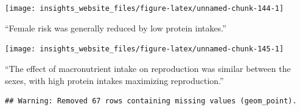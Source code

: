 \documentclass[]{book}
\newenvironment{Shaded}{\begin{snugshade}}{\end{snugshade}}
\newcommand{\DataTypeTok}[1]{\textcolor[rgb]{0.13,0.29,0.53}{#1}}
\newcommand{\DecValTok}[1]{\textcolor[rgb]{0.00,0.00,0.81}{#1}}
\newcommand{\FloatTok}[1]{\textcolor[rgb]{0.00,0.00,0.81}{#1}}
\newcommand{\KeywordTok}[1]{\textcolor[rgb]{0.13,0.29,0.53}{\textbf{#1}}}
\newcommand{\NormalTok}[1]{#1}
\newcommand{\OperatorTok}[1]{\textcolor[rgb]{0.81,0.36,0.00}{\textbf{#1}}}
\newcommand{\StringTok}[1]{\textcolor[rgb]{0.31,0.60,0.02}{#1}}
\begin{document}
\begin{center}\texttt{[image: insights\_website\_files/figure-latex/unnamed-chunk-144-1]} \end{center}

``Female risk was generally reduced by low protein intakes.''

\begin{Shaded}
\end{Shaded}

\begin{center}\texttt{[image: insights\_website\_files/figure-latex/unnamed-chunk-145-1]} \end{center}

``The effect of macronutrient intake on reproduction was similar between the sexes, with high protein intakes maximizing reproduction.''

\begin{Shaded}
\end{Shaded}

\begin{verbatim}
## Warning: Removed 67 rows containing missing values (geom_point).
\end{verbatim}
\end{document}
